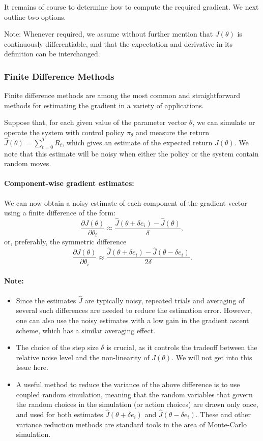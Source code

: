 It remains of course to determine how to compute the required gradient. We next outline two options.

Note: Whenever required, we assume without further mention that $J(\theta )$ is continuously differentiable, and that the expectation and derivative in its definition can be interchanged.

\subsubsection*{Finite Difference Methods}
Finite difference methods are among the most common and straightforward methods for estimating the gradient in a variety of applications.

Suppose that, for each given value of the parameter vector $\theta $, we can simulate or operate the system with control policy ${\pi _\theta }$ and measure the return  $\hat J(\theta ) = \sum\nolimits_{t = 0}^T {{R_t}} $, which gives an estimate of the expected return $J(\theta )$. We note that this estimate will be noisy when either the policy or the system contain random moves.

\paragraph{Component-wise gradient estimates:} We can now obtain a noisy estimate of each component of the gradient vector using a finite difference of the form:
\[\frac{{\partial J(\theta )}}{{\partial {\theta _i}}} \approx \frac{{\hat J(\theta  + \delta {e_i}) - \hat J(\theta )}}{\delta },\]
or, preferably, the symmetric difference
  \[\frac{{\partial J(\theta )}}{{\partial {\theta _i}}} \approx \frac{{\hat J(\theta  + \delta {e_i}) - \hat J(\theta  - \delta {e_i})}}{{2\delta }}.\]
\paragraph{Note:}
\begin{itemize}
  \item Since the estimates $\hat J$ are typically noisy, repeated trials and averaging of several such differences are needed to reduce the estimation error. However, one can also use the noisy estimates with a low gain in the gradient ascent scheme, which has a similar averaging effect.
  \item The choice of the step size $\delta $ is crucial, as it controls the tradeoff between the relative noise level and the non-linearity of $J(\theta )$. We will not get into this issue here.
  \item A useful method to reduce the variance of the above difference is to use coupled random simulation, meaning that the random variables that govern the random choices in the simulation (or action choices) are drawn only once, and used for both estimates $\hat J(\theta  + \delta {e_i})$ and $\hat J(\theta  - \delta {e_i})$. These and other variance reduction methods are standard tools in the area of Monte-Carlo simulation.
\end{itemize}

